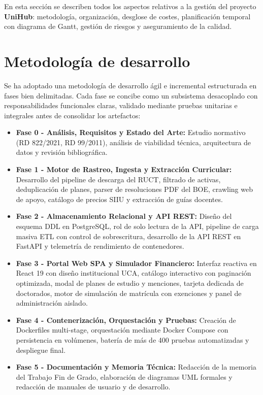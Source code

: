 En esta sección se describen todos los aspectos relativos a la gestión del proyecto \textbf{UniHub}: metodología, organización, desglose de costes, planificación temporal con diagrama de Gantt, gestión de riesgos y aseguramiento de la calidad.

\section{Metodología de desarrollo}
Se ha adoptado una metodología de desarrollo ágil e incremental estructurada en fases bien delimitadas. Cada fase se concibe como un subsistema desacoplado con responsabilidades funcionales claras, validado mediante pruebas unitarias e integrales antes de consolidar los artefactos:
\begin{itemize}
    \item \textbf{Fase 0 - Análisis, Requisitos y Estado del Arte:} Estudio normativo (RD 822/2021, RD 99/2011), análisis de viabilidad técnica, arquitectura de datos y revisión bibliográfica.
    \item \textbf{Fase 1 - Motor de Rastreo, Ingesta y Extracción Curricular:} Desarrollo del pipeline de descarga del RUCT, filtrado de activas, deduplicación de planes, parser de resoluciones PDF del BOE, crawling web de apoyo, catálogo de precios SIIU y extracción de guías docentes.
    \item \textbf{Fase 2 - Almacenamiento Relacional y API REST:} Diseño del esquema DDL en PostgreSQL, rol de solo lectura de la API, pipeline de carga masiva ETL con control de sobrescritura, desarrollo de la API REST en FastAPI y telemetría de rendimiento de contenedores.
    \item \textbf{Fase 3 - Portal Web SPA y Simulador Financiero:} Interfaz reactiva en React 19 con diseño institucional UCA, catálogo interactivo con paginación optimizada, modal de planes de estudio y menciones, tarjeta dedicada de doctorados, motor de simulación de matrícula con exenciones y panel de administración aislado.
    \item \textbf{Fase 4 - Contenerización, Orquestación y Pruebas:} Creación de Dockerfiles multi-stage, orquestación mediante Docker Compose con persistencia en volúmenes, batería de más de 400 pruebas automatizadas y despliegue final.
    \item \textbf{Fase 5 - Documentación y Memoria Técnica:} Redacción de la memoria del Trabajo Fin de Grado, elaboración de diagramas UML formales y redacción de manuales de usuario y de desarrollo.
\end{itemize}

